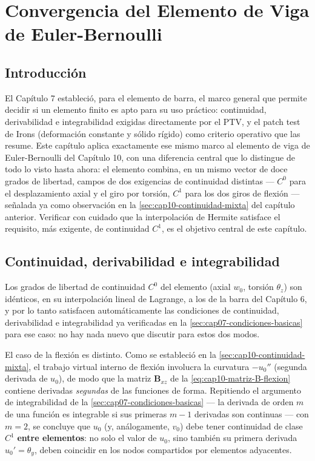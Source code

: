 \chapter{Convergencia del Elemento de Viga de Euler-Bernoulli}
\label{chap:cap11-convergencia-eb}

\section{Introducción}

El Capítulo 7 estableció, para el elemento de barra, el marco general que permite decidir si un elemento finito es apto para su uso práctico: continuidad, derivabilidad e integrabilidad exigidas directamente por el PTV, y el patch test de Irons (deformación constante y sólido rígido) como criterio operativo que las resume. Este capítulo aplica exactamente ese mismo marco al elemento de viga de Euler-Bernoulli del Capítulo 10, con una diferencia central que lo distingue de todo lo visto hasta ahora: el elemento combina, en un mismo vector de doce grados de libertad, campos de dos exigencias de continuidad distintas --- $C^0$ para el desplazamiento axial y el giro por torsión, $C^1$ para los dos giros de flexión --- señalada ya como observación en la \cref{sec:cap10-continuidad-mixta} del capítulo anterior. Verificar con cuidado que la interpolación de Hermite satisface el requisito, más exigente, de continuidad $C^1$, es el objetivo central de este capítulo.

\section{Continuidad, derivabilidad e integrabilidad}
\label{sec:cap11-condiciones-basicas}

Los grados de libertad de continuidad $C^0$ del elemento (axial $w_0$, torsión $\theta_z$) son idénticos, en su interpolación lineal de Lagrange, a los de la barra del Capítulo 6, y por lo tanto satisfacen automáticamente las condiciones de continuidad, derivabilidad e integrabilidad ya verificadas en la \cref{sec:cap07-condiciones-basicas} para ese caso: no hay nada nuevo que discutir para estos dos modos.

El caso de la flexión es distinto. Como se estableció en la \cref{sec:cap10-continuidad-mixta}, el trabajo virtual interno de flexión involucra la curvatura $-u_0''$ (segunda derivada de $u_0$), de modo que la matriz $\bm B_{xz}$ de la \cref{eq:cap10-matriz-B-flexion} contiene derivadas \emph{segundas} de las funciones de forma. Repitiendo el argumento de integrabilidad de la \cref{sec:cap07-condiciones-basicas} --- la derivada de orden $m$ de una función es integrable si sus primeras $m-1$ derivadas son continuas --- con $m=2$, se concluye que $u_0$ (y, análogamente, $v_0$) debe tener continuidad de clase $C^1$ \textbf{entre elementos}: no solo el valor de $u_0$, sino también su primera derivada $u_0'=\theta_y$, deben coincidir en los nodos compartidos por elementos adyacentes.


